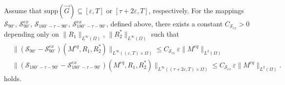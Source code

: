\documentclass{ws-m3as}
\newcommand\taup{\varepsilon}
\begin{document}
\begin{proposition}\label{prop:perturb_expl-sol}
Assume that $\text{supp}(\vec G)\subseteq[\taup,T]$ or $[\tau+2\taup,T]$, respectively. 
For the mappings $\mathcal{S}_{90^\circ}$, $\mathcal{S}_{90^\circ}^{ex}$, $\mathcal{S}_{180^\circ-\tau-90^\circ}$, $\mathcal{S}_{180^\circ-\tau-90^\circ}^{ex}$, defined above, there exists a constant $C_{\mathcal{S}_{ex}}>0$ depending only on $\|R_1\|_{L^\infty(\Omega)}$, $\|R_2^*\|_{L^\infty(\Omega)}$ such that
\[
\begin{aligned}
&\|(\mathcal{S}_{90^\circ}-\mathcal{S}_{90^\circ}^{ex})(M^{eq},R_1,R_2^*)\|_{L^\infty((\taup,T)\times\Omega)}\leq C_{\mathcal{S}_{ex}}\,\taup\|M^{eq}\|_{L^2(\Omega)}
\\
&\|(\mathcal{S}_{180^\circ-\tau-90^\circ}-\mathcal{S}_{180^\circ-\tau-90^\circ}^{ex})(M^{eq},R_1,R_2^*)\|_{L^\infty((\tau+2\taup,T)\times\Omega)}\leq C_{\mathcal{S}_{ex}}\,\taup\|M^{eq}\|_{L^2(\Omega)}.
\end{aligned}
\]
holds. 
\end{proposition}
\end{document}
